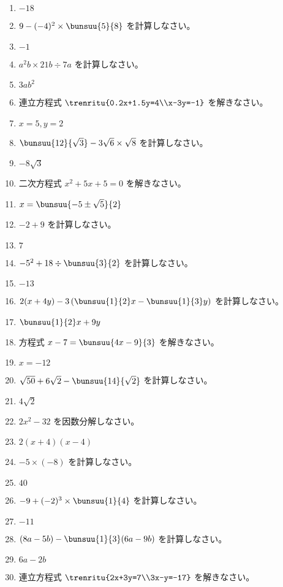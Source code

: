 \documentclass[uplatex,a4j,11pt]{jsreport}
\begin{document}
\begin{multicols}{2}
\begin{enumerate}
    \item $-18$
    \item $9-(-4)^2\times\bunsuu{5}{8}$ を計算しなさい。%
    \item $-1$
    \item $a^2b\times21b\div7a$ を計算しなさい。%
    \item $3ab^2$
    \item 連立方程式 $\trenritu{0.2x+1.5y=4\\x-3y=-1}$ を解きなさい。%
    \item $x=5, y=2$
    \item $\bunsuu{12}{\sqrt{3}}-3\sqrt{6}\times\sqrt{8}$ を計算しなさい。%
    \item $-8\sqrt{3}$
    \item 二次方程式 $x^2+5x+5=0$ を解きなさい。%
    \item $x = \bunsuu{-5\pm\sqrt{5}}{2}$
    \item $-2+9$ を計算しなさい。%
    \item $7$
    \item $-5^2+18\div\bunsuu{3}{2}$ を計算しなさい。%
    \item $-13$
    \item $2(x+4y)-3\left(\bunsuu{1}{2}x-\bunsuu{1}{3}y\right)$ を計算しなさい。%
    \item $\bunsuu{1}{2}x+9y$
    \item 方程式 $x-7=\bunsuu{4x-9}{3}$ を解きなさい。%
    \item $x=-12$
    \item $\sqrt{50}+6\sqrt{2}-\bunsuu{14}{\sqrt{2}}$ を計算しなさい。%
    \item $4\sqrt{2}$
    \item $2x^2-32$ を因数分解しなさい。%
    \item $2(x+4)(x-4)$
    \item $-5\times(-8)$ を計算しなさい。%
    \item $40$
    \item $-9+(-2)^3\times\bunsuu{1}{4}$ を計算しなさい。%
    \item $-11$
    \item $(8a-5b)-\bunsuu{1}{3}(6a-9b)$ を計算しなさい。%
    \item $6a-2b$
    \item 連立方程式 $\trenritu{2x+3y=7\\3x-y=-17}$ を解きなさい。%

\end{enumerate}
\end{multicols}
\end{document}
